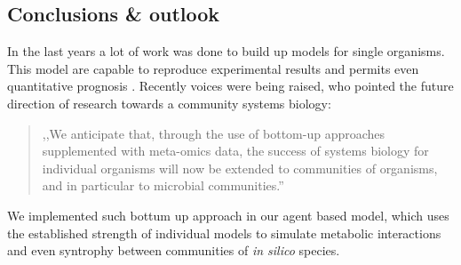 \subsection{Conclusions \& outlook}
In the last years a lot of work was done to build up models for single organisms.
This model are capable to reproduce experimental results and permits even quantitative prognosis \cite{mccloskey}.
Recently voices were being raised, who pointed the future direction of research towards a community systems biology:
\begin{quote}
,,We anticipate that, through the use of bottom-up approaches supplemented with meta-omics data, the success of systems biology for individual organisms will now be extended to communities of organisms, and in particular to microbial communities.'' \cite{CoSy}
\end{quote}
We implemented such bottum up approach in our agent based model, which uses the established strength of individual models to simulate metabolic interactions and even syntrophy between communities of \textit{in silico} species.
